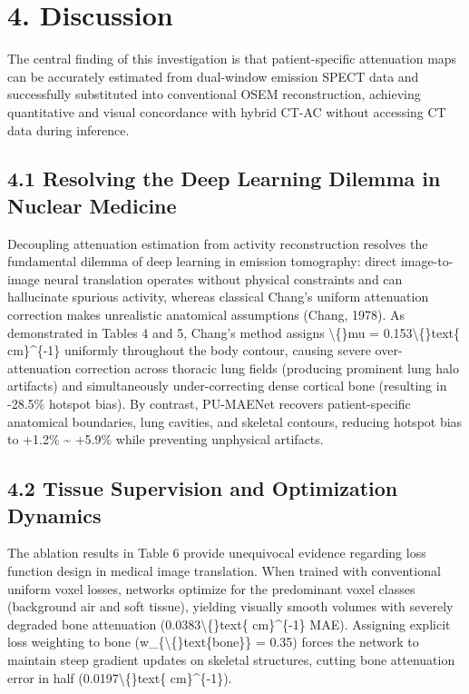 \documentclass[11pt]{article}
\begin{document}
\section*{4. Discussion}
The central finding of this investigation is that patient-specific attenuation maps can be accurately estimated from dual-window emission SPECT data and successfully substituted into conventional OSEM reconstruction, achieving quantitative and visual concordance with hybrid CT-AC without accessing CT data during inference.\par

\subsection*{4.1 Resolving the Deep Learning Dilemma in Nuclear Medicine}
Decoupling attenuation estimation from activity reconstruction resolves the fundamental dilemma of deep learning in emission tomography: direct image-to-image neural translation operates without physical constraints and can hallucinate spurious activity, whereas classical Chang's uniform attenuation correction makes unrealistic anatomical assumptions (Chang, 1978). As demonstrated in Tables 4 and 5, Chang's method assigns \textbackslash\{\}mu = 0.153\textbackslash\{\}text\{ cm\}\textasciicircum{}\{-1\} uniformly throughout the body contour, causing severe over-attenuation correction across thoracic lung fields (producing prominent lung halo artifacts) and simultaneously under-correcting dense cortical bone (resulting in -28.5\% hotspot bias). By contrast, PU-MAENet recovers patient-specific anatomical boundaries, lung cavities, and skeletal contours, reducing hotspot bias to +1.2\% \textasciitilde{} +5.9\% while preventing unphysical artifacts.\par

\subsection*{4.2 Tissue Supervision and Optimization Dynamics}
The ablation results in Table 6 provide unequivocal evidence regarding loss function design in medical image translation. When trained with conventional uniform voxel losses, networks optimize for the predominant voxel classes (background air and soft tissue), yielding visually smooth volumes with severely degraded bone attenuation (0.0383\textbackslash\{\}text\{ cm\}\textasciicircum{}\{-1\} MAE). Assigning explicit loss weighting to bone (w\_\{\textbackslash\{\}text\{bone\}\} = 0.35) forces the network to maintain steep gradient updates on skeletal structures, cutting bone attenuation error in half (0.0197\textbackslash\{\}text\{ cm\}\textasciicircum{}\{-1\}).\par
\end{document}
